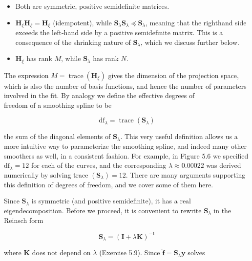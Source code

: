 \documentclass[10pt]{article}
\begin{document}
\begin{itemize}
  \item Both are symmetric, positive semidefinite matrices.
  \item $\mathbf{H}_{\xi} \mathbf{H}_{\xi}=\mathbf{H}_{\xi}$ (idempotent), while $\mathbf{S}_{\lambda} \mathbf{S}_{\lambda} \preceq \mathbf{S}_{\lambda}$, meaning that the righthand side exceeds the left-hand side by a positive semidefinite matrix. This is a consequence of the shrinking nature of $\mathbf{S}_{\lambda}$, which we discuss further below.
  \item $\mathbf{H}_{\xi}$ has rank $M$, while $\mathbf{S}_{\lambda}$ has rank $N$.
\end{itemize}

The expression $M=\operatorname{trace}\left(\mathbf{H}_{\xi}\right)$ gives the dimension of the projection space, which is also the number of basis functions, and hence the number of parameters involved in the fit. By analogy we define the effective degrees of\\
freedom of a smoothing spline to be


\begin{equation*}
\mathrm{df}_{\lambda}=\operatorname{trace}\left(\mathbf{S}_{\lambda}\right) \tag{5.16}
\end{equation*}


the sum of the diagonal elements of $\mathbf{S}_{\lambda}$. This very useful definition allows us a more intuitive way to parameterize the smoothing spline, and indeed many other smoothers as well, in a consistent fashion. For example, in Figure 5.6 we specified $\mathrm{df}_{\lambda}=12$ for each of the curves, and the corresponding $\lambda \approx 0.00022$ was derived numerically by solving trace $\left(\mathbf{S}_{\lambda}\right)=12$. There are many arguments supporting this definition of degrees of freedom, and we cover some of them here.

Since $\mathbf{S}_{\lambda}$ is symmetric (and positive semidefinite), it has a real eigendecomposition. Before we proceed, it is convenient to rewrite $\mathbf{S}_{\lambda}$ in the Reinsch form


\begin{equation*}
\mathbf{S}_{\lambda}=(\mathbf{I}+\lambda \mathbf{K})^{-1} \tag{5.17}
\end{equation*}


where $\mathbf{K}$ does not depend on $\lambda$ (Exercise 5.9). Since $\hat{\mathbf{f}}=\mathbf{S}_{\lambda} \mathbf{y}$ solves
\end{document}
